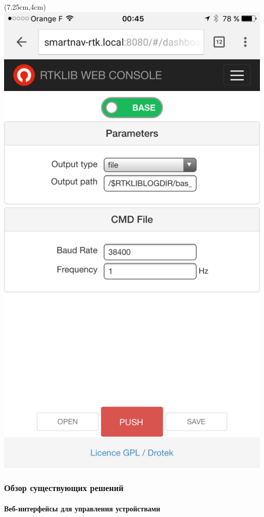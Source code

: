 \documentclass[xetex,t]{beamer}
\begin{document}
\begin{frame}
\begin{textblock*}{3.5cm}
  \end{textblock*}
  \begin{textblock*}{1.75cm}(7.25cm,4cm)
    \includegraphics[width=\textwidth]{../img/drotek-web}
  \end{textblock*}
\end{frame}


%
%
\begin{frame}
  \frametitle{Обзор существующих решений}
  \framesubtitle{Веб-интерфейсы для управления устройствами}
\end{frame}
\end{document}
